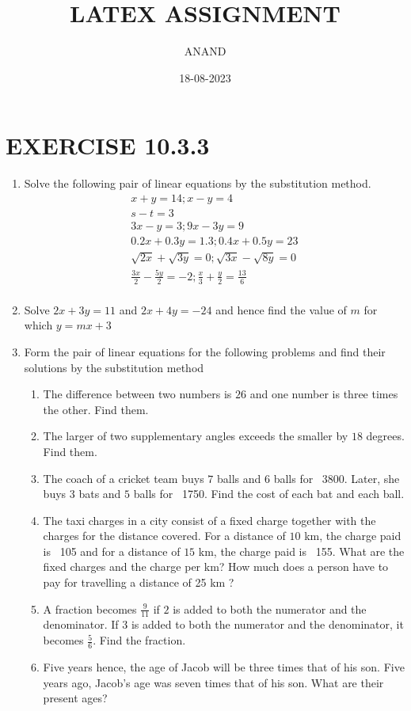\documentclass{article}
\theoremstyle{remark}
\begin{document}
\title{LATEX ASSIGNMENT}
\author{ANAND}
\date{18-08-2023}
\maketitle
\section*{EXERCISE 10.3.3}
\begin{enumerate}
\item Solve the following pair of linear equations by the substitution method.
    \begin{align}
    x+y=14 ;x-y=4\\
    s-t=3\\
    3x-y=3 ;9x-3y=9\\
    0.2x+0.3y=1.3 ;0.4x+0.5y=23\\
     \sqrt{2x}+\sqrt{3y}=0 ;\sqrt{3x}-\sqrt{8y}=0\\
    \frac{3x}{2}-\frac{5y}{2}=-2 ;\frac{x}{3}+\frac{y}{2}=\frac{13}{6}\\
    \end{align}
\item Solve $2x+3y=11$ and $2x+4y=-24$ and hence find the value of $m$ for which $y=mx+3$
\item Form the pair of linear equations for the following problems and find their solutions by the substitution method
    \begin{enumerate}[label=(\Roman*)]
    \item The difference between two numbers is $26$ and one number is three times the other. Find them.
    \item The larger of two supplementary angles exceeds the smaller by $18$ degrees. Find them.
    \item The coach of a cricket team buys $7$ balls and $6$ balls for \rupee~3800. Later, she buys $3$ bats and $5$ balls for \rupee~1750. Find the cost of each bat and each ball.
    \item The taxi charges in a city consist of a fixed charge together with the charges for the distance covered. For a distance of $10$ km, the charge paid is \rupee~105 and for a distance of $15$ km, the charge paid is \rupee~155. What are the fixed charges and the charge per km? How much does a person have to pay for travelling a distance of 25 km ? 
    \item A fraction becomes $\frac{9}{11}$ if $2$ is added to both the numerator and the denominator. If $3$ is added to both the numerator and the denominator, it becomes $\frac{5}{6}$. Find the fraction.
    \item Five years hence, the age of Jacob will be three times that of his son. Five years ago, Jacob's age was seven times that of his son. What are their present ages?
    \end{enumerate}
\end{enumerate}
\end{document}
